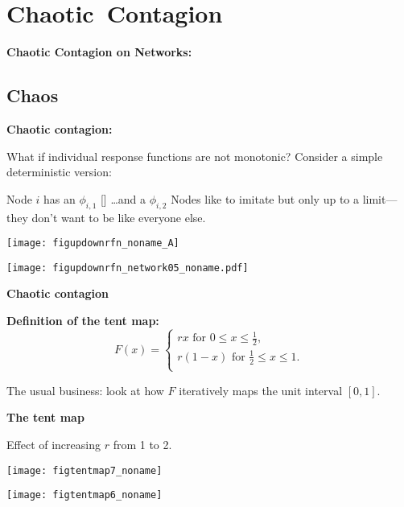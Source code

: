 \section{Chaotic\ Contagion}

  \textbf{Chaotic Contagion on Networks:}

  
  

  
  



\subsection{Chaos}

  \textbf{Chaotic contagion:}

  
     What if individual response functions are not monotonic?
    Consider a simple deterministic version:
          
      
       Node $i$ has an  $\phi_{i,1}$
      [] \ldots and a  $\phi_{i,2}$
       Nodes like to imitate but only up to a limit---they don't
        want to be like everyone else.
      
      
      \texttt{[image: figupdownrfn\_noname\_A]} 
      



  \texttt{[image: figupdownrfn\_network05\_noname.pdf]} 


  \textbf{Chaotic contagion}

  \textbf{Definition of the tent map:}
    $$ 
    F(x) = 
    \left\{
      \begin{array}{l}
        rx \mbox{\ for $0 \le x \le \frac{1}{2}$}, \\
        r(1-x) \mbox{\ for $\frac{1}{2} \le x \le 1$}. \\
      \end{array}
    \right.
    $$
    
     The usual business: 
      look at how
      $F$ iteratively maps the unit interval $[0,1]$.
    
  


  \textbf{The tent map}

  Effect of increasing $r$ from 1 to 2.
      
    \texttt{[image: figtentmap7\_noname]} 
    
    \texttt{[image: figtentmap6\_noname]} 
    
